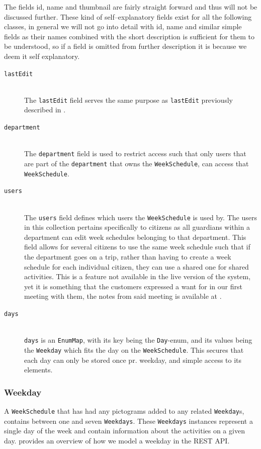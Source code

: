 \noindent
The fields id, name and thumbnail are fairly straight forward and thus will not be discussed further.
These kind of self--explanatory fields exist for all the following classes, in general we will not go into detail with id, name and similar simple fields as their names combined with the short description is sufficient for them to be understood, so if a field is omitted from further description it is because we deem it self explanatory.
\begin{description}
    \item [\texttt{lastEdit}] \hfill \\ 
    The \texttt{lastEdit} field serves the same purpose as \texttt{lastEdit} previously described in .
    \item [\texttt{department}] \hfill \\
    The \texttt{department} field is used to restrict access such that only users that are part of the \texttt{department} that owns the \texttt{WeekSchedule}, can access that \texttt{WeekSchedule}.
    \item [\texttt{users}] \hfill \\
    The \texttt{users} field defines which users the \texttt{WeekSchedule} is used by.
    The users in this collection pertains specifically to citizens as all guardians within a department can edit week schedules belonging to that department.
    This field allows for several citizens to use the same week schedule such that if the department goes on a trip, rather than having to create a week schedule for each individual citizen, they can use a shared one for shared activities.
    This is a feature not available in the live version of the system, yet it is something that the customers expressed a want for in our first meeting with them, the notes from said meeting is available at \citep{GIRAF20161stMeeting}.
    \item [\texttt{days}] \hfill \\
    \texttt{days} is an \texttt{EnumMap}, with its key being the \texttt{Day}-enum, and its values being the \texttt{Weekday} which fits the day on the \texttt{WeekSchedule}.
    This secures that each day can only be stored once pr. weekday, and simple access to its elements.
\end{description}

\subsubsection{Weekday}
A \texttt{WeekSchedule} that has had any pictograms added to any related \texttt{Weekday}s, contains between one and seven \texttt{Weekdays}.
These \texttt{Weekdays} instances represent a single day of the week and contain information about the activities on a given day.
 provides an overview of how we model a weekday in the REST API.

